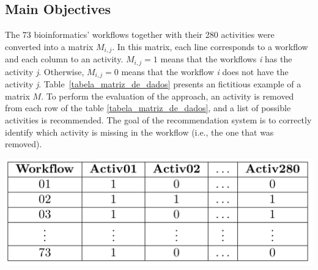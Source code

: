 \documentclass[40pt, a0, portrait]{a0poster}
\begin{document}
\begin{multicols}{2}
\color{DarkSlateGray} %

\section*{Main Objectives}

The 73 bioinformatics' workflows together with their 280 activities were converted into a matrix $M_{i, j}$. In this matrix, each line corresponds to a workflow and each column to an activity. $M_{i, j} = 1$ means that the workflows \emph{i} has the activity \emph{j}. Otherwise, $M_{i, j} = 0$ means that the workflow \emph{i} does not have the activity \emph{j}. Table~\ref{tabela_matriz_de_dados} presents an fictitious example of a matrix \(M\). To perform the evaluation of the approach, an activity is removed from each row of the table \ref{tabela_matriz_de_dados}, and a list of possible activities is recommended. The goal of the recommendation system is to correctly identify which activity is missing in the workflow (i.e., the one that was removed).
\begin{center}\vspace{1cm}
\includegraphics[width=0.8\linewidth]{matrizSimples.png}
\end{center}\vspace{1cm}



\end{multicols}
\end{document}
